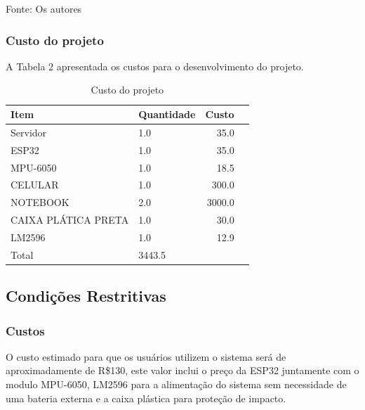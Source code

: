 Fonte: Os autores
    







\subsubsection{Custo do projeto}
A Tabela 2 apresentada os custos para o desenvolvimento do projeto.


\begin{table}[H]
\caption{Custo do projeto}

\begin{adjustbox}{width=80mm,center}


\begin{tabular}{llrr}

\toprule
        Item &  Quantidade &   Custo \\
\midrule
     Servidor &         1.0 &    35.0 \\
       ESP32 &         1.0 &    35.0 \\
   MPU-6050 &         1.0 &    18.5 \\
     CELULAR &         1.0 &   300.0 \\
     NOTEBOOK &         2.0 &  3000.0 \\
 CAIXA PLÁTICA PRETA &         1.0 &    30.0 \\
      LM2596 &         1.0 &    12.9 \\
        Total &           3443.5 \\
\bottomrule
\end{tabular}
    
\end{adjustbox}
\end{table}



\subsection{\textbf{Condições Restritivas}}
\subsubsection{Custos}

O custo estimado para que os usuários utilizem o sistema será de aproximadamente de R\$130, este valor inclui o preço da ESP32 juntamente com o modulo MPU-6050, LM2596 para a alimentação do sistema sem necessidade de uma bateria externa e a caixa plástica para proteção de impacto.


